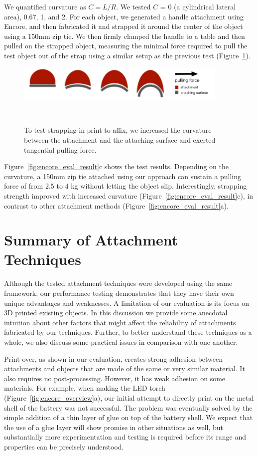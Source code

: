 We quantified curvature as $C = L/R$. We tested $C$ = 0 (a cylindrical lateral area), 0.67, 1, and 2. For each object, we generated a handle attachment using Encore, and then fabricated it and strapped it around the center of the object using a 150mm zip tie. We then firmly clamped the handle to a table and then pulled on the strapped object, measuring the minimal force required to pull the test object out of the strap using a similar setup as the previous test (Figure~\ref{fig:encore_eval_strap}).

\begin{figure}[h]
  \centering
  \includegraphics[width=0.9\textwidth]{figures/encore_eval_strap.pdf}
  \caption{To test strapping in print-to-affix, we increased the curvature between the attachment and the attaching surface and exerted tangential pulling force.}~\label{fig:encore_eval_strap}
\end{figure}

Figure~\ref{fig:encore_eval_result}c shows the test results. Depending on the curvature, a 150mm zip tie attached using our approach can sustain a pulling force of from 2.5 to 4 kg without letting the object slip. Interestingly, strapping strength improved with increased curvature (Figure~\ref{fig:encore_eval_result}c), in contrast to other attachment methods (Figure~\ref{fig:encore_eval_result}a).

\section{Summary of Attachment Techniques}
Although the tested attachment techniques were developed using the same framework, our performance testing demonstrates that they have their own unique advantages and weaknesses. A limitation of our evaluation is its focus on 3D printed existing objects. In this discussion we provide some anecdotal intuition about other factors that might affect the reliability of attachments fabricated by our techniques. Further, to better understand these techniques as a whole, we also discuss some practical issues in comparison with one another.

Print-over, as shown in our evaluation, creates strong adhesion between attachments and objects that are made of the same or very similar material. It also requires no post-processing. However, it has weak adhesion on some materials. For example, when making the LED torch (Figure~\ref{fig:encore_overview}a), our initial attempt to directly print on the metal shell of the battery was not successful. The problem was eventually solved by the simple addition of a thin layer of glue on top of the battery shell. We expect that the use of a glue layer will show promise in other situations as well, but substantially more experimentation and testing is required before its range and properties can be precisely understood.

